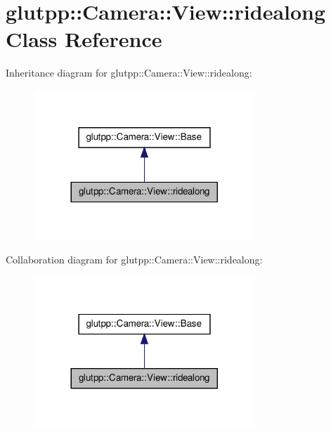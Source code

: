 \hypertarget{classglutpp_1_1Camera_1_1View_1_1ridealong}{\section{glutpp\-:\-:\-Camera\-:\-:\-View\-:\-:ridealong \-Class \-Reference}
\label{classglutpp_1_1Camera_1_1View_1_1ridealong}
}


\-Inheritance diagram for glutpp\-:\-:\-Camera\-:\-:\-View\-:\-:ridealong\-:\nopagebreak
\begin{figure}[H]
\begin{center}
\leavevmode
\includegraphics[width=236pt]{classglutpp_1_1Camera_1_1View_1_1ridealong__inherit__graph}
\end{center}
\end{figure}


\-Collaboration diagram for glutpp\-:\-:\-Camera\-:\-:\-View\-:\-:ridealong\-:\nopagebreak
\begin{figure}[H]
\begin{center}
\leavevmode
\includegraphics[width=236pt]{classglutpp_1_1Camera_1_1View_1_1ridealong__coll__graph}
\end{center}
\end{figure}
